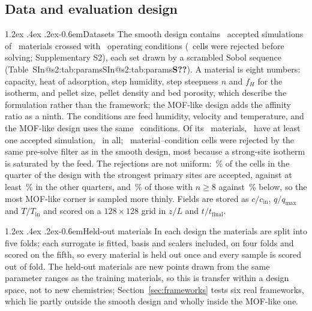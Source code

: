 \documentclass[10pt,a4paper]{article}
\makeatletter
\renewcommand\paragraph{\@startsection{paragraph}{4}{\z@}%
  {1.2ex \@plus .4ex \@minus .2ex}{-0.6em}{\normalfont\normalsize\bfseries}}
\newcommand{\SIref}[1]{\ifcsname SIn@#1\endcsname\csname SIn@#1\endcsname\else\textbf{S??}\fi}
\makeatother
\begin{document}
\subsection{Data and evaluation design}
\label{sec:data}

\paragraph{Datasets} The smooth design contains \nDataNsamples\ accepted simulations of
\nDataNmaterials\ materials crossed with \nDataNconditions\ operating conditions
(\nDataNrejected\ cells were rejected before solving; Supplementary S2), each set
drawn by a scrambled Sobol sequence (Table~\SIref{s2:tab:params}). A material is eight numbers: capacity, heat
of adsorption, step humidity, step steepness \(n\) and \(f_H\) for the isotherm, and pellet
size, pellet density and bed porosity, which describe the formulation rather than the
framework; the MOF-like design adds the affinity ratio as a ninth. The conditions are feed
humidity, velocity and temperature, and the MOF-like design uses the same \nDataNconditions\
conditions. Of its \nVthreeNdrawn\ materials, \nVthreeNmat\ have at least one accepted
simulation, \nVthreeNsamples\ in all; \nVthreeNrejected\ material--condition cells were rejected by the same pre-solve filter as in
the smooth design, most because a strong-site isotherm is saturated by the feed. The
rejections are not uniform: \nAccStrong\,\% of the cells in the quarter of the design with
the strongest primary sites are accepted, against at least \nAccOther\,\% in the other
quarters, and \nAccSteep\,\% of those with \(n \geq 8\) against \nAccMild\,\% below, so the
most MOF-like corner is sampled more thinly. Fields are
stored as \(c/c_{\mathrm{in}}\), \(q/q_{\max}\) and \(T/T_{\mathrm{in}}\) and scored on a
\(128 \times 128\) grid in \(z/L\) and \(t/t_{\mathrm{final}}\).

\paragraph{Held-out materials} In each design the materials are split into five folds; each
surrogate is fitted, basis and scalers included, on four folds and scored on the fifth, so
every material is held out once and every sample is scored out of fold. The held-out
materials are new points drawn from the same parameter ranges as the training materials,
so this is transfer within a design space, not to new chemistries;
Section~\ref{sec:frameworks} tests six real frameworks, which lie partly outside the smooth
design and wholly inside the MOF-like one.
\end{document}
